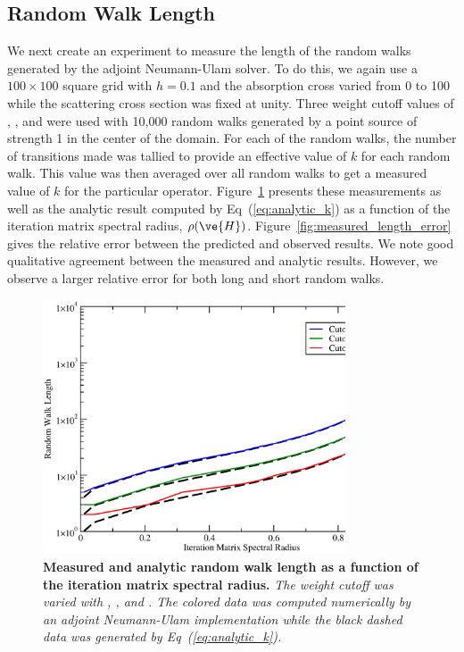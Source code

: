 \documentclass[preprint,11pt]{elsarticle}
\begin{document}
\subsection{Random Walk Length}
\label{subsec:walk_length}

We next create an experiment to measure the length of the random walks
generated by the adjoint Neumann-Ulam solver. To do this, we again use a $100
\times 100$ square grid with $h=0.1$ and the absorption cross varied from 0 to
100 while the scattering cross section was fixed at unity. Three weight cutoff
values of , , and  were used with 10,000 random
walks generated by a point source of strength 1 in the center of the
domain. For each of the random walks, the number of transitions made was
tallied to provide an effective value of $k$ for each random walk. This value
was then averaged over all random walks to get a measured value of $k$ for the
particular operator. Figure~\ref{fig:measured_length} presents these
measurements as well as the analytic result computed by
Eq~(\ref{eq:analytic_k}) as a function of the iteration matrix spectral
radius, $\rho(\ve{H})$. Figure~\ref{fig:measured_length_error} gives the
relative error between the predicted and observed results. We note good
qualitative agreement between the measured and analytic results. However, we
observe a larger relative error for both long and short random walks.
\begin{figure}[ht!]
  \begin{center}
    \includegraphics[width=0.8\textwidth]{random_walk_length.eps}
  \end{center}
  \caption{\textbf{Measured and analytic random walk length as a function of
      the iteration matrix spectral radius.} \textit{The weight cutoff was
      varied with , , and . The colored data was
      computed numerically by an adjoint Neumann-Ulam implementation while the
      black dashed data was generated by Eq~(\ref{eq:analytic_k}).}}
  \label{fig:measured_length}
\end{figure}
\end{document}
